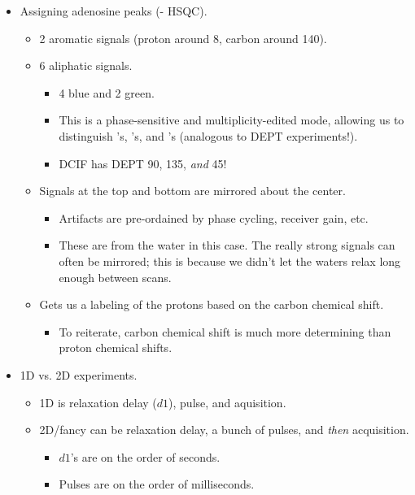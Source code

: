 \documentclass[../notes.tex]{subfiles}
\begin{document}
\begin{itemize}
    \item Assigning adenosine peaks (- HSQC).
    \begin{itemize}
        \item 2 aromatic signals (proton around 8, carbon around 140).
        \item 6 aliphatic signals.
        \begin{itemize}
            \item 4 blue and 2 green.
            \item This is a phase-sensitive and multiplicity-edited mode, allowing us to distinguish 's, 's, and 's (analogous to DEPT experiments!).
            \item DCIF has DEPT 90, 135, \emph{and} 45!
        \end{itemize}
        \item Signals at the top and bottom are mirrored about the center.
        \begin{itemize}
            \item Artifacts are pre-ordained by phase cycling, receiver gain, etc.
            \item These are from the water in this case. The really strong signals can often be mirrored; this is because we didn't let the waters relax long enough between scans.
        \end{itemize}
        \item Gets us a labeling of the protons based on the carbon chemical shift.
        \begin{itemize}
            \item To reiterate, carbon chemical shift is much more determining than proton chemical shifts.
        \end{itemize}
    \end{itemize}
    \item 1D vs. 2D experiments.
    \begin{itemize}
        \item 1D is relaxation delay ($d1$), pulse, and aquisition.
        \item 2D/fancy can be relaxation delay, a bunch of pulses, and \emph{then} acquisition.
        \begin{itemize}
            \item $d1$'s are on the order of seconds.
            \item Pulses are on the order of milliseconds.
        \end{itemize}

\end{itemize}
\end{itemize}
\end{document}
